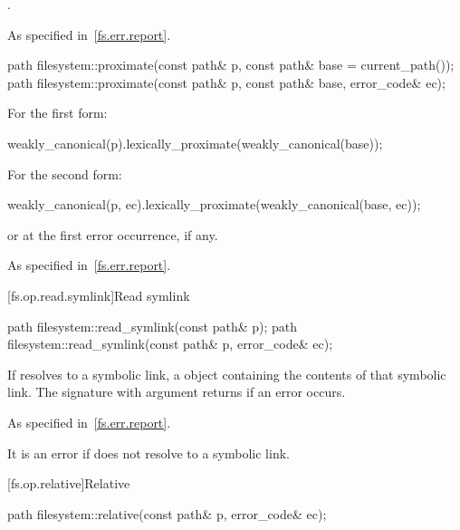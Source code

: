 \begin{itemdescr}
\pnum
\returns
{}.

\pnum
\throws
As specified in~\ref{fs.err.report}.
\end{itemdescr}

%
\begin{itemdecl}
path filesystem::proximate(const path& p, const path& base = current_path());
path filesystem::proximate(const path& p, const path& base, error_code& ec);
\end{itemdecl}

\begin{itemdescr}
\pnum
\returns
For the first form:
\begin{codeblock}
weakly_canonical(p).lexically_proximate(weakly_canonical(base));
\end{codeblock}
  For the second form:
\begin{codeblock}
weakly_canonical(p, ec).lexically_proximate(weakly_canonical(base, ec));
\end{codeblock}
  or  at the first error occurrence, if any.

\pnum
\throws
As specified in~\ref{fs.err.report}.
\end{itemdescr}

[fs.op.read.symlink]{Read symlink}

%
\begin{itemdecl}
path filesystem::read_symlink(const path& p);
path filesystem::read_symlink(const path& p, error_code& ec);
\end{itemdecl}

\begin{itemdescr}
\pnum
\returns
If  resolves to a symbolic
  link, a  object containing the contents of that symbolic
  link. The signature with argument 
  returns  if an error occurs.

\pnum
\throws
As specified in~\ref{fs.err.report}.
\begin{note}
It is an error if  does not
  resolve to a symbolic link.
\end{note}
\end{itemdescr}

[fs.op.relative]{Relative}

%
\begin{itemdecl}
path filesystem::relative(const path& p, error_code& ec);
\end{itemdecl}

